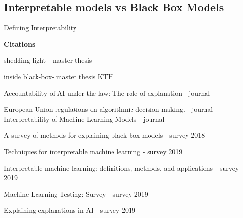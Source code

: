 \documentclass[english]{tktltiki2}
\theoremstyle{definition}
\theoremstyle{remark}
\begin{document}
%

\subsection{Interpretable models vs Black Box Models} %

Defining Interpretability \citet{du2018techniques} \citet{mittelstadt2019explaining} \citet{guidotti2018survey} \citet{honegger2018shedding}




\textbf{Citations}
\par
\citet{honegger2018shedding} shedding light - master thesis
\par
\citet{beillevaire2018inside} inside black-box- master thesis KTH
\newline \par


\citet{doshi2017accountability} Accountability of AI under the law: The role of explanation - journal
\par
\citet{goodman2017european} European Union regulations on algorithmic decision-making. - journal
\citet{bibal2016interpretability} Interpretability of Machine Learning Models - journal
\newline \par

\citet{guidotti2018survey} A survey of methods for explaining black box models - survey 2018
\par
\citet{du2018techniques} Techniques for interpretable machine learning - survey 2019
\par
\citet{murdoch2019interpretable} Interpretable machine learning: definitions, methods, and applications - survey 2019
\par
\citet{zhang2019machine} Machine Learning Testing: Survey - survey 2019
\par
\citet{mittelstadt2019explaining} Explaining explanations in AI - survey 2019
\newline \par 
\end{document}
